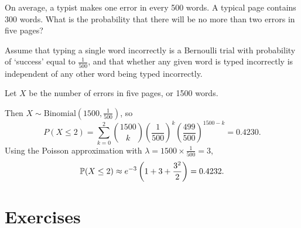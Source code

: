 \begin{example}
On average, a typist makes one error in every 500 words. A typical page contains 300 words. What is the probability that there will be no more than two errors in five pages?
\end{example}

\begin{solution}
Assume that typing a single word incorrectly is a Bernoulli trial with probability of `success' equal to $\frac{1}{500}$, and that whether any given word is typed incorrectly is independent of any other word being typed incorrectly.

Let $X$ be the number of errors in five pages, or 1500 words. 

Then $X\sim\text{Binomial}\left(1500,\frac{1}{500}\right)$, so
\[
P(X\leq 2)
	= \sum_{k=0}^2\binom{1500}{k}\left(\frac{1}{500}\right)^k\left(\frac{499}{500}\right)^{1500-k} = 0.4230.
\]
Using the Poisson approximation with $\lambda=1500\times \frac{1}{500} = 3$,
\[
\mathbb{P}(X\leq 2) \approx e^{-3}\left(1 + 3 + \frac{3^2}{2}\right) = 0.4232.
\]
\end{solution}


\newpage
\section{Exercises}


\endinput
